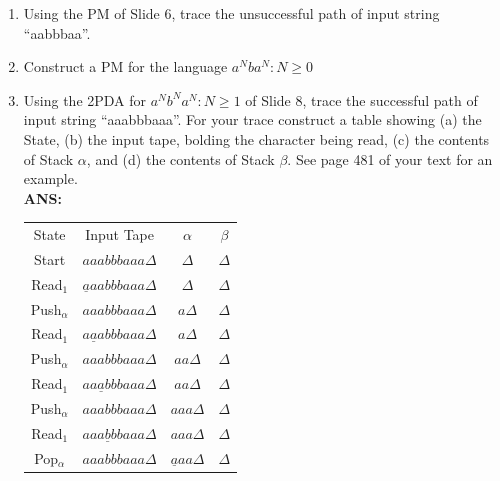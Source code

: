\documentclass[letterpaper, 12 pt]{article}
\begin{document}
\begin{enumerate}

    \item Using the PM of Slide 6, trace the unsuccessful path of input string
        ``aabbbaa''.

    \item Construct a PM for the language $a^Nba^N: N \geq 0$

    \item Using the 2PDA for $a^Nb^Na^N: N \geq 1$ of Slide 8, trace the
        successful path of input string ``aaabbbaaa''. For your trace construct
        a table showing (a) the State, (b) the input tape, bolding the character
        being read, (c) the contents of Stack $\alpha$, and (d) the contents of
        Stack $\beta$. See page 481 of your text for an example. \\
        \textbf{ANS:} \\
        \begin{center}
            \begin{tabular}{| c c c c |}
                \rowcolor{gray!50}
                State             & Input Tape                            & $\alpha$                    & $\beta$ \\
                Start         & $aaabbbaaa                   \Delta $ & $\Delta$                    & $\Delta$ \\
                Read$_1$      & $\underline{a}aabbbaaa       \Delta $ & $\Delta$                    & $\Delta$ \\
                Push$_\alpha$ & $aaabbbaaa                   \Delta $ & $a \Delta$                  & $\Delta$ \\
                Read$_1$      & $a\underline{a}abbbaaa       \Delta $ & $a \Delta$                  & $\Delta$ \\
                Push$_\alpha$ & $aaabbbaaa                   \Delta $ & $a a \Delta$                & $\Delta$ \\
                Read$_1$      & $aa\underline{a}bbbaaa       \Delta $ & $a a \Delta$                & $\Delta$ \\
                Push$_\alpha$ & $aaabbbaaa                   \Delta $ & $a a a \Delta$              & $\Delta$ \\
                Read$_1$      & $aaa\underline{b}bbaaa       \Delta $ & $a a a \Delta$              & $\Delta$ \\
                Pop$_\alpha$  & $aaabbbaaa                   \Delta $ & $\underline{a} a a \Delta$  & $\Delta$ \\

\end{tabular}
\end{center}
\end{enumerate}
\end{document}

